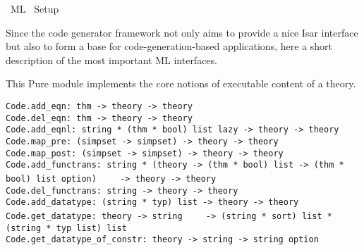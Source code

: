 %
\begin{isabellebody}%
\def\isabellecontext{ML}%
%
\isadelimtheory
%
\endisadelimtheory
%
\isatagtheory
{}\isamarkupfalse%
\ {\isachardoublequoteopen}ML{\isachardoublequoteclose}\isanewline
{}\ Setup\isanewline
{}%
\endisatagtheory
{\isafoldtheory}%
%
\isadelimtheory
%
\endisadelimtheory
%
\isamarkuptrue%
%
\begin{isamarkuptext}%
Since the code generator framework not only aims to provide
  a nice Isar interface but also to form a base for
  code-generation-based applications, here a short
  description of the most important ML interfaces.%
\end{isamarkuptext}%
\isamarkuptrue%
%
\isamarkuptrue%
%
\begin{isamarkuptext}%
This Pure module implements the core notions of
  executable content of a theory.%
\end{isamarkuptext}%
\isamarkuptrue%
%
\isamarkuptrue%
%
\isadelimmlref
%
\endisadelimmlref
%
\isatagmlref
%
\begin{isamarkuptext}%
\begin{mldecls}
  \verb|Code.add_eqn: thm -> theory -> theory| \\
  \verb|Code.del_eqn: thm -> theory -> theory| \\
  \verb|Code.add_eqnl: string * (thm * bool) list lazy -> theory -> theory| \\
  \verb|Code.map_pre: (simpset -> simpset) -> theory -> theory| \\
  \verb|Code.map_post: (simpset -> simpset) -> theory -> theory| \\
  \verb|Code.add_functrans: string * (theory -> (thm * bool) list -> (thm * bool) list option)|\isasep\isanewline%
\verb|    -> theory -> theory| \\
  \verb|Code.del_functrans: string -> theory -> theory| \\
  \verb|Code.add_datatype: (string * typ) list -> theory -> theory| \\
  \verb|Code.get_datatype: theory -> string|\isasep\isanewline%
\verb|    -> (string * sort) list * (string * typ list) list| \\
  \verb|Code.get_datatype_of_constr: theory -> string -> string option|
  \end{mldecls}


\end{isamarkuptext}
\end{isabellebody}
